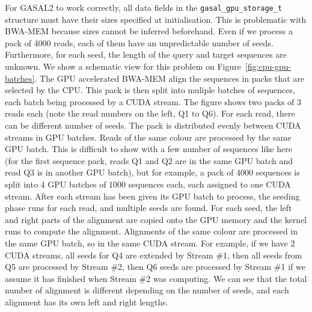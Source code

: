For GASAL2 to work correctly, all data fields in the \texttt{gasal\_gpu\_storage\_t} structure must have their sizes specified at initialisation. This is problematic with BWA-MEM because sizes cannot be inferred beforehand. Even if we process a pack of 4000 reads, each of them have an unpredictable number of seeds. Furthermore, for each seed, the length of the query and target sequences are unknown. We show a schematic view for this problem on Figure~\ref{fig:cpu-gpu-batches}. The GPU accelerated BWA-MEM align the sequences in packs that are selected by the CPU. This pack is then split into muliple batches of sequences, each batch being processed by a CUDA stream. The figure shows two packs of 3 reads each (note the read numbers on the left, Q1 to Q6). For each read, there can be different number of seeds. The pack is distributed evenly between CUDA streams in GPU batches. Reads of the same colour are processed by the same GPU batch. This is difficult to show with a few number of sequences like here (for the first sequence pack, reads Q1 and Q2 are in the same GPU batch and read Q3 is in another GPU batch), but for example, a pack of 4000 sequences is split into 4 GPU batches of 1000 sequences each, each assigned to one CUDA stream. After each stream has been given its GPU batch to process, the seeding phase runs for each read, and multiple seeds are found. For each seed, the left and right parts of the alignment are copied onto the GPU memory and the kernel runs to compute the alignment. Alignments of the same colour are processed in the same GPU batch, so in the same CUDA stream. For example, if we have 2 CUDA streams, all seeds for Q4 are extended by Stream \#1, then all seeds from Q5 are processed by Stream \#2, then Q6 seeds are processed by Stream \#1 if we assume it has finished when Stream \#2 was computing. We can see that the total number of alignment is different depending on the number of seeds, and each alignment has its own left and right lengths.

